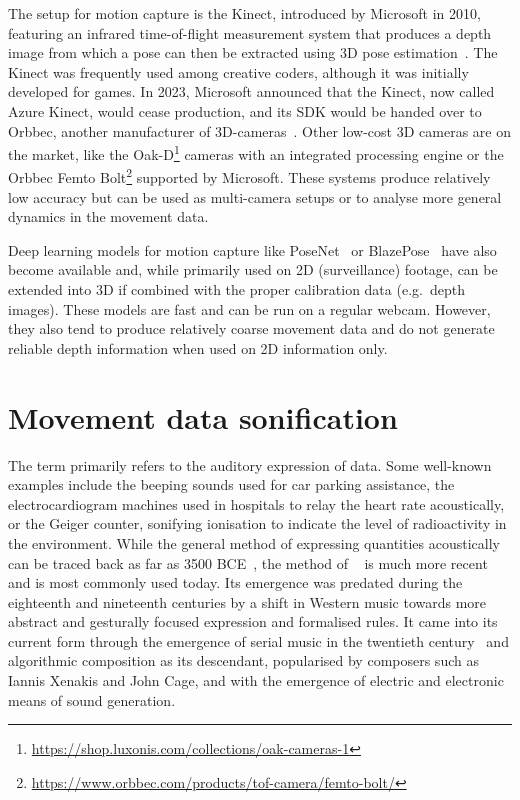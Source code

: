 The  setup for motion capture is the Kinect, introduced by Microsoft in 2010, featuring an infrared time-of-flight measurement system that produces a depth image from which a pose can then be extracted using \ac{3D} pose estimation~\parencite[see][]{poseEstimationPaper}.
The Kinect was frequently used among creative coders, although it was initially developed for games.
In 2023, Microsoft announced that the Kinect, now called Azure Kinect, would cease production, and its \ac{SDK} would be handed over to Orbbec, another manufacturer of \ac{3D}-cameras~\parencite{kinectDiscontinued}.
Other low-cost 3D cameras are on the market, like the Oak-D\footnote{\url{https://shop.luxonis.com/collections/oak-cameras-1}} cameras with an integrated processing engine or the Orbbec Femto Bolt\footnote{\url{https://www.orbbec.com/products/tof-camera/femto-bolt/}} supported by Microsoft.
These systems produce relatively low accuracy but can be used as multi-camera setups or to analyse more general dynamics in the movement data.

Deep learning models for motion capture like PoseNet~\parencite{kendall2016posenet} or BlazePose~\parencite{bazarevsky2020blazepose} have also become available and, while primarily used on \ac{2D} (surveillance) footage, can be extended into \ac{3D} if combined with the proper calibration data (e.g.\ depth images).
These models are fast and can be run on a regular webcam. However, they also tend to produce relatively coarse movement data and do not generate reliable depth information when used on \ac{2D} information only.

\section{Movement data sonification}
\label{sec:movement-data-sonification}

The term  primarily refers to the auditory expression of data.
Some well-known examples include the beeping sounds used for car parking assistance, the electrocardiogram machines used in hospitals to relay the heart rate acoustically, or the Geiger counter, sonifying ionisation to indicate the level of radioactivity in the environment.
While the general method of expressing quantities acoustically can be traced back as far as 3500 BCE~\parencite[178]{sonificationPreHistory}, the method of ~\parencite[Chapter~15]{sonificationHandbook} is much more recent and is most commonly used today.
Its emergence was predated during the eighteenth and nineteenth centuries by a shift in Western music towards more abstract and gesturally focused expression and formalised rules.
It came into its current form through the emergence of serial music in the twentieth century~\parencite[179-180]{sonificationPreHistory} and algorithmic composition as its descendant, popularised by composers such as Iannis Xenakis and John Cage, and with the emergence of electric and electronic means of sound generation.

